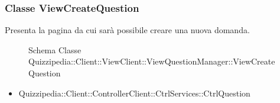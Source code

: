 \subsubsection{Classe ViewCreateQuestion}
Presenta la pagina da cui sarà possibile creare una nuova domanda.
\begin{figure}[H]
\centering
\noindent{}
\caption{Schema Classe Quizzipedia::Client::ViewClient::ViewQuestionManager::ViewCreateQuestion}
\end{figure}
\begin{itemize}
\item Quizzipedia::Client::ControllerClient::CtrlServices::CtrlQuestion
\end{itemize}
